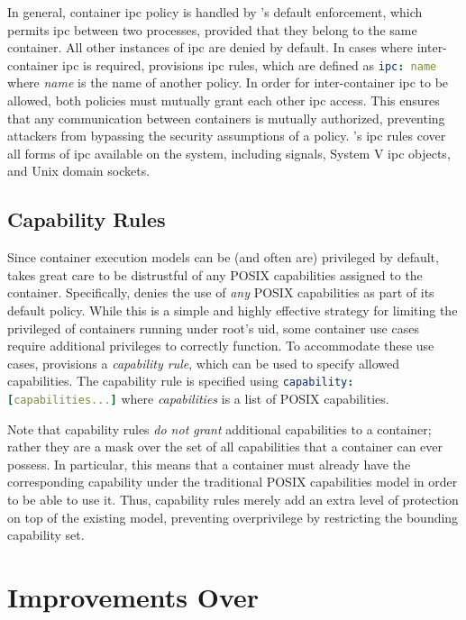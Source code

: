 In general, container \gls{ipc} policy is handled by \bpfcontain{}'s default enforcement,
which permits \gls{ipc} between two processes, provided that they belong to the same
container. All other instances of \gls{ipc} are denied by default. In cases where
inter-container \gls{ipc} is required, \bpfcontain{} provisions \gls{ipc} rules, which are
defined as \lstinline[language=yaml]|ipc: name| where \textit{name} is the name of another
\bpfcontain{} policy. In order for inter-container \gls{ipc} to be allowed, both policies
must mutually grant each other \gls{ipc} access. This ensures that any communication
between containers is mutually authorized, preventing attackers from bypassing the
security assumptions of a policy. \bpfcontain{}'s \gls{ipc} rules cover all forms of
\gls{ipc} available on the system, including signals, System V \gls{ipc} objects, and Unix
domain sockets.

\subsection{Capability Rules}

Since container execution models can be (and often are) privileged by default,
\bpfcontain{} takes great care to be distrustful of any POSIX capabilities assigned to the
container. Specifically, \bpfcontain{} denies the use of \textit{any} POSIX capabilities
as part of its default policy. While this is a simple and highly effective strategy for
limiting the privileged of containers running under root's \gls{uid}, some container use
cases require additional privileges to correctly function. To accommodate these use cases,
\bpfcontain{} provisions a \textit{capability rule}, which can be used to specify allowed
capabilities. The capability rule is specified using \lstinline[language=yaml]|capability: [capabilities...]|
where \textit{capabilities} is a list of POSIX capabilities.

Note that capability rules \textit{do not grant} additional capabilities to a container;
rather they are a mask over the set of all capabilities that a container can ever possess.
In particular, this means that a container must already have the corresponding capability
under the traditional POSIX capabilities model in order to be able to use it. Thus,
capability rules merely add an extra level of protection on top of the existing model,
preventing overprivilege by restricting the bounding capability set.


\section{Improvements Over \bpfbox{}}%
\label{s:bpfcontain-improvements}

